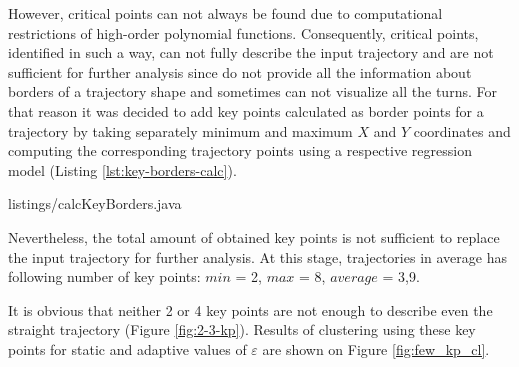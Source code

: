 However, critical points can not always be found due to computational restrictions of high-order polynomial functions. Consequently, critical points, identified in such a way, can not fully describe the input trajectory and are not sufficient for further analysis since do not provide all the information about borders of a trajectory shape and sometimes can not visualize all the turns. For that reason it was decided to add key points calculated as border points for a trajectory by taking separately minimum and maximum $X$ and $Y$ coordinates and computing the corresponding trajectory points using a respective regression model (Listing \ref{lst:key-borders-calc}).

 {listings/calcKeyBorders.java}

Nevertheless, the total amount of obtained key points is not sufficient to replace the input trajectory for further analysis. At this stage, trajectories in average has following number of key points: $min$ = 2, $max$ = 8, $average$ = 3,9.

It is obvious that neither 2 or 4 key points are not enough to describe even the straight trajectory (Figure \ref{fig:2-3-kp}). Results of clustering using these key points for static and adaptive values of $\varepsilon$ are shown on Figure \ref{fig:few_kp_cl}.


